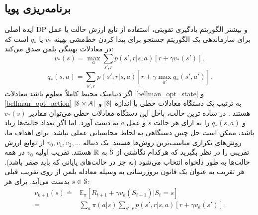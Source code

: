 \subsection{برنامه‌ریزی پویا}

ایده اصلی DP و بیشتر الگوریتم یادگیری تقویتی‌، استفاده از تابع ارزش حالت یا عمل برای سازماندهی یک الگوریتم جستجو برای پیدا کردن خط‌مشی بهینه
$v_*$
یا
$q_*$
است
که در معادلات بهینگی بلمن صدق می‌کند:
\begin{equation}
v_{*}(s) = \max_{a} \sum_{s',r} p(s',r | s,a)[r + \gamma v_*(s')],
\label{bellman_opt_state}
\end{equation}
\begin{equation}
q_{*}(s,a) = \sum_{s',r} p(s',r | s,a)[r + \gamma \max_{a'} q_* (s',a')].
\label{bellman_opt_action}
\end{equation}
اگر دینامیک محیط کاملاً معلوم باشد معادلات
\ref{bellman_opt_state}
و
\ref{bellman_opt_action}
به ترتیب یک دستگاه معادلات خطی با اندازه
 $|\EuScript{S}|$
 و
 $|\EuScript{S} \times \EuScript{A}|$
  هستند \cite{suttonbook}.
در ساده ترین حالت، باحل این دستگاه معادلات  خطی می‌توان  مقادیر 
$v_*(s)$
و
$q_*(s,a)$
را به ازای هر حالت $s$ و عمل $a$ به دست آورد. اما اگر تعداد حالت‌ها زیاد باشد، ممکن است حل چنین دستگاهی به لحاظ محاسباتی عملی نباشد. برای اهداف ما، روش‌های تکراری مناسب‌ترین روش‌ها هستند. یک دنباله $ v_0 , v_1 , v_2 , ...$ 
از توابع ارزش تقریبی
را در نظر بگیرید که هرکدام نگاشتی از
$\EuScript{S}$ 
به 
$\mathbb{R}$
 هستند.
تقریب اولیه $v_0$
در همه حالت‌ها
به طور دلخواه انتخاب می‌شود (به جز در حالت‌های پایانی که باید صفر باشد). هر تقریب به عنوان یک قانون بروزرسانی به وسیله معادله بلمن از روی تقریب قبلی بدست می‌آید. برای هر 
$s \in \EuScript{S}$:
\begin{align}
v_{k+1}(s) \doteq & \mathbb{E}_{\pi} [R_{t+1} + \gamma v_k(S_{t+1}) | S_t=s]  \nonumber \\
=& \sum_{a} \pi(a|s) \sum_{s',r} p(s',r | s,a)[r + \gamma v_k(s')].
\end{align}
